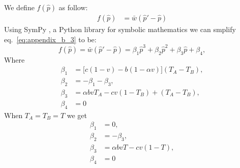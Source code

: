 \documentclass[12pt]{extarticle}
\begin{document}
  We define $f(\hat{p})$ as follow:
  \begin{equation} \label{eq:appendix_b_3}\tag{B.3}
    \begin{aligned}
      f(\hat{p}) &= 
      \bar{w}(\hat{p}' - \hat{p})
    \end{aligned}
    \end{equation}
  Using SymPy \cite{10.7717/peerj-cs.103}, a Python library for symbolic mathematics we can smplify eq.~\ref{eq:appendix_b_3} to be:
\begin{equation} \label{eq:appendix_b_4}
  f(\hat{p}) = \bar{w}(\hat{p}'-\hat{p}) =
  \beta_1 \hat{p}^3 + \beta_2 \hat{p}^2 + \beta_3 \hat{p} + \beta_4,
\end{equation}
Where
\begin{equation} \label{eq:appendix_b_5}\tag{B.4}
\begin{aligned}
  \beta_1 &= \big[c(1-v) - b (1-\alpha v)\big] (T_A-T_B) , \\
  \beta_2 &= -\beta_1 -\beta_3 ,  \\
  \beta_3 &= \alpha bvT_A - cv(1-T_B) + (T_A-T_B), \\
  \beta_4 & = 0
\end{aligned}
\end{equation}
When $T_A=T_B=T$ we get
\begin{equation} \label{eq:appendix_b_5}\tag{B.4}
  \begin{aligned}
    \beta_1 &= 0 , \\
    \beta_2 &= -\beta_3 ,  \\
    \beta_3 &= \alpha bvT- cv(1-T), \\
    \beta_4 & = 0
  \end{aligned}
  \end{equation}
\end{document}
